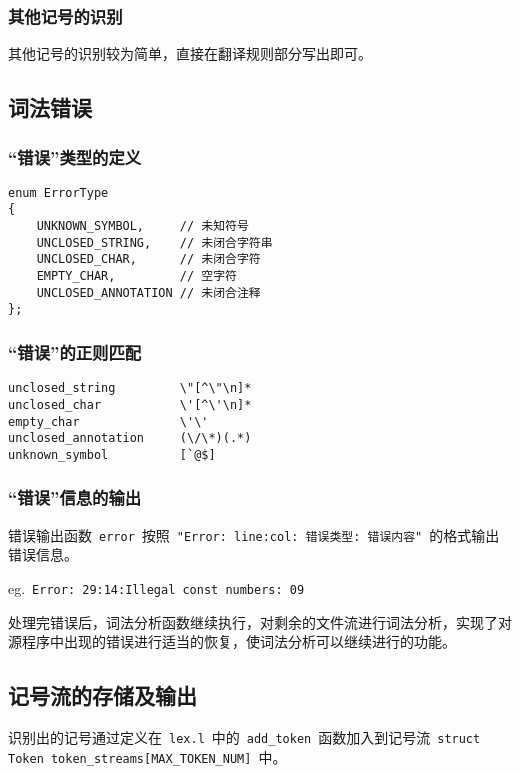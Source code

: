 \documentclass[lang=cn,11pt,a4paper]{paper}
\begin{document}
\subsubsection{其他记号的识别}

其他记号的识别较为简单，直接在翻译规则部分写出即可。

\subsection{词法错误}

\subsubsection{“错误”类型的定义}

\begin{lstlisting}
enum ErrorType
{
    UNKNOWN_SYMBOL,     // 未知符号
    UNCLOSED_STRING,    // 未闭合字符串
    UNCLOSED_CHAR,      // 未闭合字符
    EMPTY_CHAR,         // 空字符
    UNCLOSED_ANNOTATION // 未闭合注释
};
\end{lstlisting}

\subsubsection{“错误”的正则匹配}

\begin{lstlisting}
unclosed_string			\"[^\"\n]*
unclosed_char			\'[^\'\n]*
empty_char				\'\'
unclosed_annotation		(\/\*)(.*)
unknown_symbol 			[`@$]
\end{lstlisting}

\subsubsection{“错误”信息的输出}
错误输出函数\ \lstinline{error}\ 按照\ \lstinline{"Error: line:col: 错误类型: 错误内容"}\ 的格式输出错误信息。

eg.\ \lstinline{Error: 29:14:Illegal const numbers: 09}

处理完错误后，词法分析函数继续执行，对剩余的文件流进行词法分析，实现了对源程序中出现的错误进行适当的恢复，使词法分析可以继续进行的功能。

\subsection{记号流的存储及输出}

识别出的记号通过定义在\ \lstinline{lex.l}\ 中的\ \lstinline{add_token}\ 函数加入到记号流\ \lstinline{struct Token token_streams[MAX_TOKEN_NUM]}\ 中。
\end{document}
